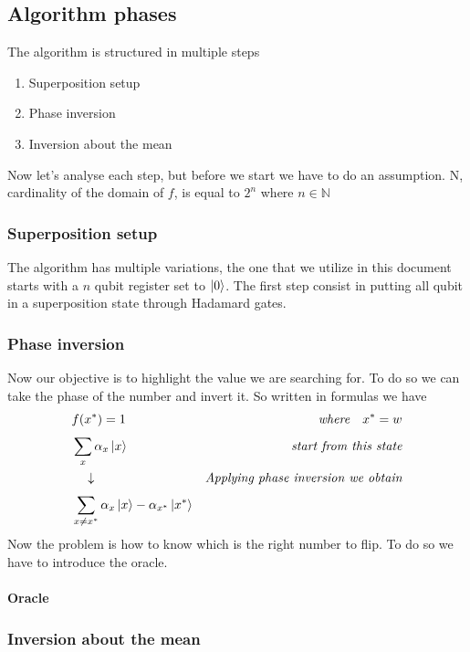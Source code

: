\documentclass[main.tex]{subfiles}
\theoremstyle{definition}
\begin{document}
\subsection{Algorithm phases}
The algorithm is structured in multiple steps \begin{enumerate}
\item Superposition setup
\item Phase inversion
\item Inversion about the mean
\end{enumerate}
Now let's analyse each step, but before we start we have to do an assumption. N, cardinality of the domain of $f$, is equal to $2^{n}$ where $n\in\mathbb{N}$
\subsubsection{Superposition setup}
The algorithm has multiple variations, the one that we utilize in this document starts with a $n$ qubit register set to $\ket{0}$.
The first step consist in putting all qubit in a superposition state through Hadamard gates.
\subsubsection{Phase inversion}
Now our objective is to highlight the value we are searching for. To do so we can take the phase of the number and invert it. So written in formulas we have
\begin{align*}
& f(x^{*})=1 &\textit{where} \quad x^{*}=w \\
& \sum_{x}^{}\alpha_{x}\ket{x} & \textit{start from this state} \\
& \quad\downarrow & \textit{Applying phase inversion we obtain} \\
& \sum_{x\neq x^{*}}^{}\alpha_{x}\ket{x}-\alpha_{x^{*}}\ket{x^{*}}
\end{align*}
Now the problem is how to know which is the right number to flip. To do so we have to introduce the oracle.
\paragraph{Oracle} 

\subsubsection{Inversion about the mean}
\end{document}
